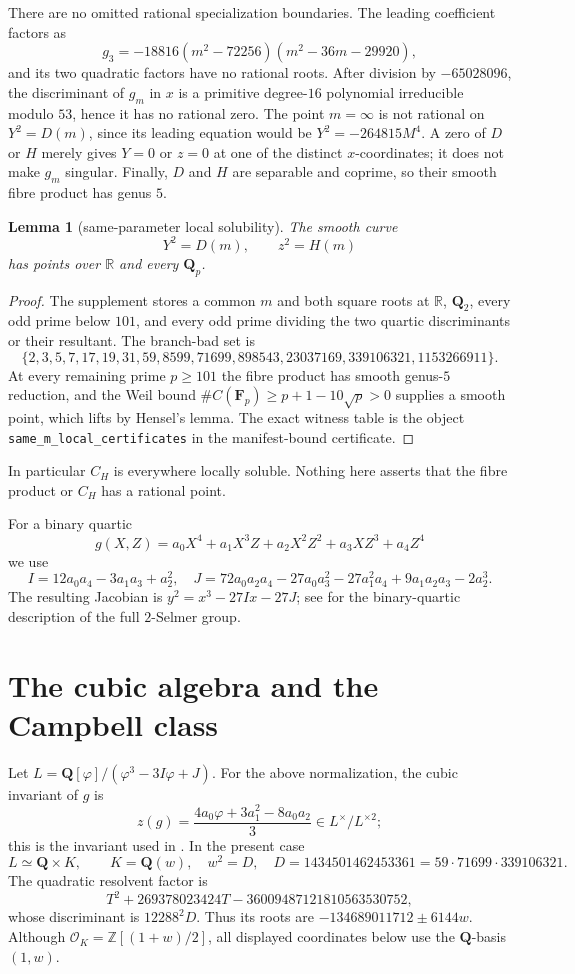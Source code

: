 \documentclass[11pt]{article}
\newtheorem{lemma}[theorem]{Lemma}
\newcommand{\Q}{\mathbf Q}
\newcommand{\F}{\mathbf F}
\begin{document}
There are no omitted rational specialization boundaries.  The leading
coefficient factors as
\[
g_3=-18816(m^2-72256)(m^2-36m-29920),
\]
and its two quadratic factors have no rational roots.  After division by
$-65028096$, the discriminant of $g_m$ in $x$ is a primitive degree-$16$
polynomial irreducible modulo $53$, hence it has no rational zero.  The point
$m=\infty$ is not rational on $Y^2=D(m)$, since its leading equation would be
$Y^2=-264815M^4$.  A zero of $D$ or $H$ merely gives $Y=0$ or $z=0$ at one
of the distinct $x$-coordinates; it does not make $g_m$ singular.  Finally,
$D$ and $H$ are separable and coprime, so their smooth fibre product has
genus $5$.

\begin{lemma}[same-parameter local solubility]\label{lem:same-m}
The smooth curve
\[
Y^2=D(m),\qquad z^2=H(m)
\]
has points over $\mathbb R$ and every $\Q_p$.
\end{lemma}
\begin{proof}
The supplement stores a common $m$ and both square roots at $\mathbb R$,
$\Q_2$, every odd prime below $101$, and every odd prime dividing the two
quartic discriminants or their resultant.  The branch-bad set is
\[
\{2,3,5,7,17,19,31,59,8599,71699,898543,23037169,
339106321,1153266911\}.
\]
At every remaining prime $p\ge101$ the fibre product has smooth genus-$5$
reduction, and the Weil bound
$\#C(\F_p)\ge p+1-10\sqrt p>0$ supplies a smooth point, which lifts by
Hensel's lemma.  The exact witness table is the object
\texttt{same\_m\_local\_certificates} in the manifest-bound certificate.
\end{proof}
In particular $C_H$ is everywhere locally soluble.  Nothing here asserts
that the fibre product or $C_H$ has a rational point.

For a binary quartic
\[
 g(X,Z)=a_0X^4+a_1X^3Z+a_2X^2Z^2+a_3XZ^3+a_4Z^4
\]
we use
\[
 I=12a_0a_4-3a_1a_3+a_2^2,
 \quad
 J=72a_0a_2a_4-27a_0a_3^2-27a_1^2a_4
      +9a_1a_2a_3-2a_2^3.
\]
The resulting Jacobian is $y^2=x^3-27Ix-27J$; see
\cite[Lemma~2.1]{Fisher2022} for the binary-quartic description of the
full $2$-Selmer group.

\section{The cubic algebra and the Campbell class}
Let $L=\Q[\varphi]/(\varphi^3-3I\varphi+J)$.  For the above normalization,
the cubic invariant of $g$ is
\begin{equation}\label{eq:cubic-invariant}
 z(g)=\frac{4a_0\varphi+3a_1^2-8a_0a_2}{3}
       \in L^\times/L^{\times2};
\end{equation}
this is the invariant used in \cite[Section~2]{Fisher2022}.  In the present
case
\[
 L\simeq\Q\times K,\qquad
K=\Q(w),\quad w^2=D,\quad
 D=1434501462453361=59\cdot71699\cdot339106321.
\]
The quadratic resolvent factor is
\[
 T^2+269378023424T-36009487121810563530752,
\]
whose discriminant is $12288^2D$.  Thus its roots are
$-134689011712\pm6144w$.  Although $\mathcal O_K=\mathbb
Z[(1+w)/2]$, all displayed coordinates below use the $\Q$-basis $(1,w)$.
\end{document}
